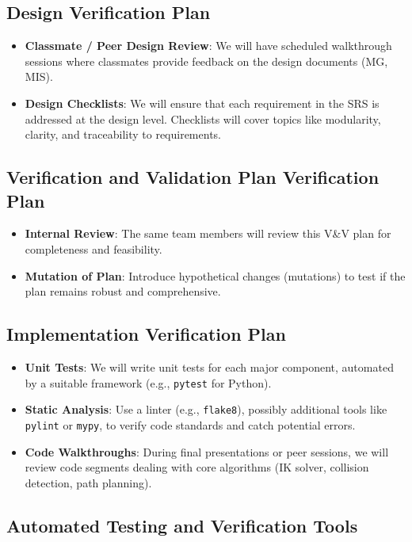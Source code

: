 \documentclass[12pt, titlepage]{article}
\begin{document}
\subsection{Design Verification Plan}
\begin{itemize}
  \item \textbf{Classmate / Peer Design Review}: We will have scheduled walkthrough sessions where classmates provide feedback on the design documents (MG, MIS).
  \item \textbf{Design Checklists}: We will ensure that each requirement in the SRS is addressed at the design level. Checklists will cover topics like modularity, clarity, and traceability to requirements.
\end{itemize}


\subsection{Verification and Validation Plan Verification Plan}

\begin{itemize}
  \item \textbf{Internal Review}: The same team members will review this V\&V plan for completeness and feasibility.
  \item \textbf{Mutation of Plan}: Introduce hypothetical changes (mutations) to test if the plan remains robust and comprehensive.
\end{itemize}

\subsection{Implementation Verification Plan}

\begin{itemize}
  \item \textbf{Unit Tests}: We will write unit tests for each major component, automated by a suitable framework (e.g., \texttt{pytest} for Python).
  \item \textbf{Static Analysis}: Use a linter (e.g., \texttt{flake8}), possibly additional tools like \texttt{pylint} or \texttt{mypy}, to verify code standards and catch potential errors.
  \item \textbf{Code Walkthroughs}: During final presentations or peer sessions, we will review code segments dealing with core algorithms (IK solver, collision detection, path planning).
\end{itemize}

\subsection{Automated Testing and Verification Tools}
\end{document}
